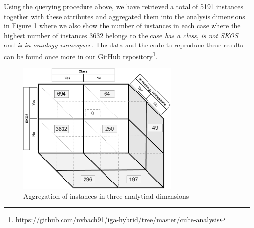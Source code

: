 Using the querying procedure above, we have retrieved a total of 5191 instances together with these attributes and aggregated them into the analysis dimensions in Figure \ref{fig:cube-aggregation} where we also show the number of instances in each case where the highest number of instances 3632 belongs to the case \textit{has a class}, \textit{is not SKOS} and \textit{is in ontology namespace}. The data and the code to reproduce these results can be found once more in our GitHub repository\footnote{\url{https://github.com/nvbach91/iga-hybrid/tree/master/cube-analysis}}.

\begin{figure}[ht]
    \centering
    \includegraphics[width=8cm]{figures/cube-aggregation.pdf}
    \caption{Aggregation of instances in three analytical dimensions}
    \label{fig:cube-aggregation}
\end{figure}
